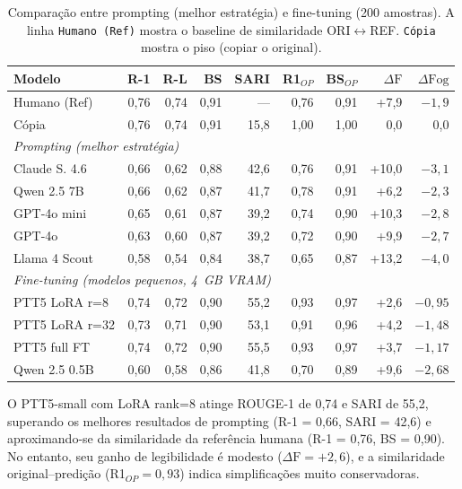\documentclass[a4paper, twocolumn, 11pt, twoside]{article}
\begin{document}
\begin{table}[htbp]
\centering
\caption{Comparação entre prompting (melhor estratégia) e
         fine-tuning (200 amostras). A linha {\tt Humano (Ref)}
         mostra o baseline de similaridade ORI$\leftrightarrow$REF.
         {\tt Cópia} mostra o piso (copiar o original).}
\label{tab:finetuning}
\footnotesize
\setlength{\tabcolsep}{3pt}
\begin{tabular}{l r r r r r r r r}
\toprule
Modelo & R-1 & R-L & BS & SARI & R1$_{OP}$ & BS$_{OP}$ & $\Delta \mathrm{F}$ & $\Delta \mathrm{Fog}$ \\
\midrule
Humano (Ref)   & 0,76 & 0,74 & 0,91 & ---   & 0,76 & 0,91 & +7,9  & $-1,9$ \\
Cópia          & 0,76 & 0,74 & 0,91 & 15,8  & 1,00 & 1,00 & 0,0   & 0,0 \\
\midrule
\multicolumn{9}{l}{\textit{Prompting (melhor estratégia)}} \\
Claude S. 4.6  & 0,66 & 0,62 & 0,88 & 42,6  & 0,76 & 0,91 & +10,0 & $-3,1$ \\
Qwen 2.5 7B    & 0,66 & 0,62 & 0,87 & 41,7  & 0,78 & 0,91 & +6,2  & $-2,3$ \\
GPT-4o mini    & 0,65 & 0,61 & 0,87 & 39,2  & 0,74 & 0,90 & +10,3 & $-2,8$ \\
GPT-4o         & 0,63 & 0,60 & 0,87 & 39,2  & 0,72 & 0,90 & +9,9  & $-2,7$ \\
Llama 4 Scout  & 0,58 & 0,54 & 0,84 & 38,7  & 0,65 & 0,87 & +13,2 & $-4,0$ \\
\midrule
\multicolumn{9}{l}{\textit{Fine-tuning (modelos pequenos, 4~GB VRAM)}} \\
PTT5 LoRA r=8 & 0,74 & 0,72 & 0,90 & 55,2  & 0,93 & 0,97 & +2,6  & $-0,95$ \\
PTT5 LoRA r=32 & 0,73 & 0,71 & 0,90 & 53,1  & 0,91 & 0,96 & +4,2  & $-1,48$ \\
PTT5 full FT   & 0,74 & 0,72 & 0,90 & 55,5  & 0,93 & 0,97 & +3,7  & $-1,17$ \\
Qwen 2.5 0.5B  & 0,60 & 0,58 & 0,86 & 41,8  & 0,70 & 0,89 & +9,6  & $-2,68$ \\
\bottomrule
\end{tabular}
\end{table}

O PTT5-small com LoRA rank=8 atinge ROUGE-1 de 0,74 e SARI de 55,2,
superando os melhores resultados de prompting (R-1 = 0,66, SARI = 42,6)
e aproximando-se da similaridade da referência humana
(R-1 = 0,76, BS = 0,90). No entanto, seu ganho de legibilidade
é modesto ($\Delta \mathrm{F} = +2,6$), e a similaridade
original--predição (R1$_{OP} = 0,93$) indica simplificações muito
conservadoras.
\end{document}
